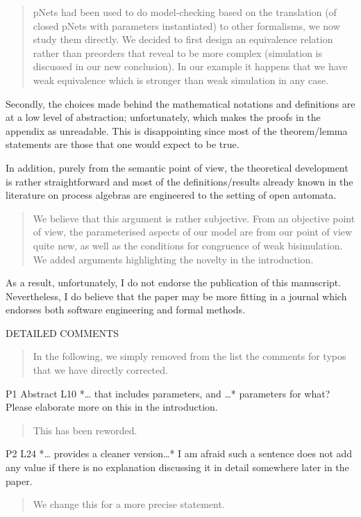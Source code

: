\documentclass{article}
\begin{document}
\begin{quote}
pNets had been used to do model-checking based on the translation (of closed pNets with parameters instantiated) to other formalisms, we now study them directly. We decided to first design an equivalence relation rather than  preorders that reveal to be more complex (simulation is discussed in our new conclusion). In our example it happens that we have weak equivalence which is stronger than weak simulation in any case.
\end{quote}

Secondly, the choices made behind the mathematical notations and definitions are at a low level of abstraction; unfortunately, which makes the proofs in the appendix as unreadable. This is disappointing since most of the theorem/lemma statements are those that one would expect to be true. 


In addition, purely from the semantic point of view, the theoretical development is rather straightforward and most of the definitions/results already known in the literature on process algebras are engineered to the setting of open automata. 
\begin{quote}
We believe that this argument is rather subjective. From an objective point of view, the parameterised aspects of our model are from our point of view quite new, as well as the conditions for congruence of weak bisimulation. We added arguments highlighting the novelty in the introduction.
\end{quote}


As a result, unfortunately, I do not endorse the publication of this manuscript. Nevertheless, I do believe that the paper may be more fitting in a journal which endorses both software engineering and formal methods.




DETAILED COMMENTS
\begin{quote}
In the following, we simply removed from the list the comments for typos that we have directly corrected.
\end{quote}

P1 Abstract L10 *… that includes parameters, and …* parameters for what? Please elaborate more on this in the introduction.
\begin{quote}
This has been reworded.
\end{quote}

P2 L24 *… provides a cleaner version…* I am afraid such a sentence does not add any value if there is no explanation discussing it in detail somewhere later in the paper.
\begin{quote}
We change this for a more precise statement.
\end{quote}
\end{document}
